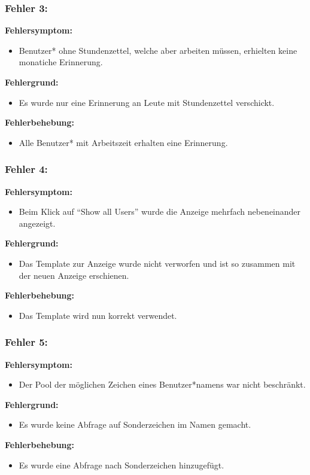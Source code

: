 \subsubsection{Fehler 3:} %
\textbf{Fehlersymptom:}
	\begin{itemize}
		\item Benutzer* ohne Stundenzettel, welche aber arbeiten müssen, erhielten keine monatiche Erinnerung.
	\end{itemize}
\textbf{Fehlergrund:}
	\begin{itemize}
		\item Es wurde nur eine Erinnerung an Leute mit Stundenzettel verschickt.
	\end{itemize}
\textbf{Fehlerbehebung:}
	\begin{itemize}
		\item Alle Benutzer* mit Arbeitszeit erhalten eine Erinnerung.
	\end{itemize}

\subsubsection{Fehler 4:} %
\textbf{Fehlersymptom:}
	\begin{itemize}
		\item Beim Klick auf "`Show all Users"' wurde die Anzeige mehrfach nebeneinander angezeigt.
	\end{itemize}
\textbf{Fehlergrund:}
	\begin{itemize}
		\item Das Template zur Anzeige wurde nicht verworfen und ist so zusammen mit der neuen Anzeige erschienen.%
	\end{itemize}
\textbf{Fehlerbehebung:}
	\begin{itemize}
		\item Das Template wird nun korrekt verwendet.
	\end{itemize}
	
\subsubsection{Fehler 5:} %
\textbf{Fehlersymptom:}
	\begin{itemize}
		\item Der Pool der möglichen Zeichen eines Benutzer*namens war nicht beschränkt.
	\end{itemize}
\textbf{Fehlergrund:}
	\begin{itemize}
		\item Es wurde keine Abfrage auf Sonderzeichen im Namen gemacht.
	\end{itemize}
\textbf{Fehlerbehebung:}
	\begin{itemize}
		\item Es wurde eine Abfrage nach Sonderzeichen hinzugefügt.
	\end{itemize}

